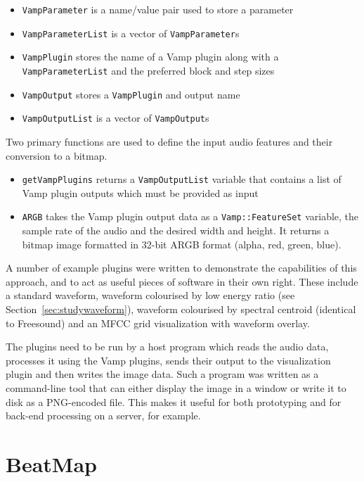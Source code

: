 {\singlespacing
\begin{itemize}
  \item \texttt{VampParameter} is a name/value pair used to store a parameter
  \item \texttt{VampParameterList} is a vector of \texttt{VampParameter}s
  \item \texttt{VampPlugin} stores the name of a Vamp plugin along with a\\
    \texttt{VampParameterList} and the preferred block and step sizes
  \item \texttt{VampOutput} stores a \texttt{VampPlugin} and output name
  \item \texttt{VampOutputList} is a vector of \texttt{VampOutput}s
\end{itemize}
}

Two primary functions are used to define the input audio features and their conversion to a bitmap.

\begin{itemize}
  \item \texttt{getVampPlugins} returns a \texttt{VampOutputList} variable that contains a list of Vamp plugin outputs
    which must be provided as input
  \item \texttt{ARGB} takes the Vamp plugin output data as a \texttt{Vamp::FeatureSet} variable, the sample rate of the
    audio and the desired width and height. It returns a bitmap image formatted in 32-bit ARGB format (alpha, red,
    green, blue).
\end{itemize}

A number of example plugins were written to demonstrate the capabilities of this approach, and to act as useful pieces
of software in their own right.  These include a standard waveform, waveform colourised by low energy ratio (see
Section~\ref{sec:studywaveform}), waveform colourised by spectral centroid (identical to Freesound) and an MFCC grid
visualization with waveform overlay.

The plugins need to be run by a host program which reads the audio data, processes it using the Vamp plugins, sends
their output to the visualization plugin and then writes the image data. Such a program was written as a command-line
tool that can either display the image in a window or write it to disk as a PNG-encoded file. This makes it useful for
both prototyping and for back-end processing on a server, for example.

\clearpage
\section{BeatMap}\label{sec:beatmap}


